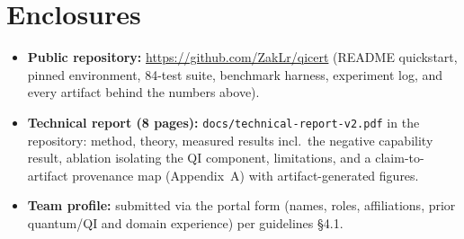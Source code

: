 \documentclass[10pt]{article}
\begin{document}
\section*{Enclosures}
\begin{itemize}
\item \textbf{Public repository:} \url{https://github.com/ZakLr/qicert}
(README quickstart, pinned environment, 84-test suite, benchmark harness,
experiment log, and every artifact behind the numbers above).
\item \textbf{Technical report (8 pages):} \texttt{docs/technical-report-v2.pdf}
in the repository: method, theory, measured results incl.\ the negative
capability result, ablation isolating the QI component, limitations, and a
claim-to-artifact provenance map (Appendix~A) with artifact-generated
figures.
\item \textbf{Team profile:} submitted via the portal form (names, roles,
affiliations, prior quantum/QI and domain experience) per guidelines \S4.1.
\end{itemize}
\end{document}
